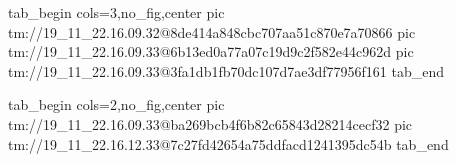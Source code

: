  
 
 
 
 

\qqSecOrig


\ifcmt
  tab_begin cols=3,no_fig,center
    pic tm://19_11_22.16.09.32@8de414a848cbc707aa51c870e7a70866
    pic tm://19_11_22.16.09.33@6b13ed0a77a07c19d9c2f582e44c962d
    pic tm://19_11_22.16.09.33@3fa1db1fb70dc107d7ae3df77956f161
  tab_end
\fi


\ifcmt
  tab_begin cols=2,no_fig,center
    pic tm://19_11_22.16.09.33@ba269bcb4f6b82c65843d28214cecf32
    pic tm://19_11_22.16.12.33@7c27fd42654a75ddfacd1241395dc54b
  tab_end
\fi

